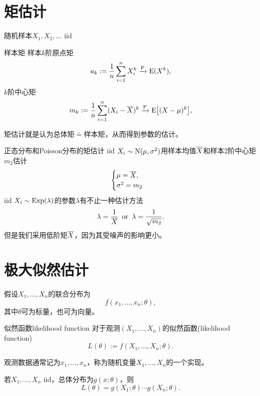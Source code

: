 \section{矩估计}
随机样本$X_1,X_2,\ldots$ iid
\begin{definition}{样本矩}{}
	样本$k$阶原点矩
	\begin{equation}\label{eq:ps-raw-sample-moment}
		a_k := \frac1n\sum_{i=1}^nX_i^k \xrightarrow{\operatorname{P}} \operatorname{E}(X^k),
	\end{equation}
	$k$阶中心矩
	\begin{equation}\label{eq:ps-central-sample-moment}
		m_k := \frac1n\sum_{i=1}^n(X_i - \overline{X})^k \xrightarrow{\operatorname{P}} \operatorname{E}\bigl[(X - \mu)^k\bigr],
	\end{equation}
\end{definition}
矩估计就是认为总体矩$\doteq$样本矩，从而得到参数的估计。
\begin{example}{正态分布和Poisson分布的矩估计}{}
	iid $X_i \sim \operatorname{N}(\mu,\sigma^2)$用样本均值$\overline{X}$和样本2阶中心矩$m_2$估计
	\[
		\begin{cases}
			\mu = \overline{X},\\
			\sigma^2 = m_2
		\end{cases}
	\]
	\tcblower
	iid $X_i \sim \operatorname{Exp}(\lambda)$的参数$\lambda$有不止一种估计方法
	\[
		\lambda = \frac1{\overline{X}}\enspace\text{or}\enspace\lambda = \frac1{\sqrt{m_2}}.
	\]
	但是我们采用低阶矩$\overline{X}$，因为其受噪声的影响更小。
\end{example}
\section{极大似然估计}
假设$X_1,\ldots,X_n$的联合分布为 
\[
	f(x_1,\ldots,x_n;\theta),
\]
其中$\theta$可为标量，也可为向量。
\begin{definition}{似然函数}{likelihood function}
	对于观测$(X_1,\ldots,X_n)$的似然函数(likelihood function)
	\begin{equation}
		L(\theta) := f(X_1,\ldots,X_n;\theta).
	\end{equation}
\end{definition}

\begin{remark}
	观测数据通常记为$x_1,\ldots,x_n$，称为随机变量$X_1,\ldots,X_n$的一个实现。
\end{remark}

\begin{corollary}
	若$X_1,\ldots,X_n$ iid，总体分布为$g(x;\theta)$，则
	\begin{equation}\label{eq:ps-independent-likelihood}
		L(\theta) = g(X_1;\theta)\cdots g(X_n;\theta).
	\end{equation}
\end{corollary}

